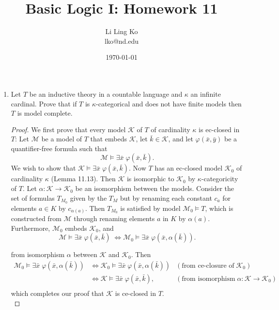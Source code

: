 \documentclass{article}
\begin{document}
\title{Basic Logic I: Homework 11}
\author{Li Ling Ko\\ lko@nd.edu}
\date{\today}
\maketitle

\begin{enumerate}[label={\bf Q\arabic*:}]
  \item Let $T$ be an inductive theory in a countable language and $\kappa$
    an infinite cardinal. Prove that if $T$ is $\kappa$-categorical and
    does not have finite models then $T$ is model complete.

    \begin{proof}
      We first prove that every model $\mathcal{K}$ of $T$ of cardinality
      $\kappa$ is ec-closed in $T$: Let $\mathcal{M}$ be a model of $T$
      that embeds $\mathcal{K}$, let $\bar{k}\in\mathcal{K}$, and let
      $\varphi(\bar{x},\bar{y})$ be a quantifier-free formula such that
      \[\mathcal{M}\models \exists\bar{x}\; \varphi(\bar{x},\bar{k}).\] We
      wish to show that $\mathcal{K}\models \exists\bar{x}\;
      \varphi(\bar{x},\bar{k})$. Now $T$ has an ec-closed model
      $\mathcal{K}_0$ of cardinality $\kappa$ (Lemma 11.13). Then
      $\mathcal{K}$ is isomorphic to $\mathcal{K}_0$ by
      $\kappa$-categoricity of $T$. Let
      $\alpha:\mathcal{K}\rightarrow\mathcal{K}_0$ be an isomorphism
      between the models. Consider the set of formulas $T_{M_0}$ given by
      the $T_M$ but by renaming each constant $c_a$ for elements $a\in K$
      by $c_{\alpha(a)}$. Then $T_{M_0}$ is satisfied by model
      $\mathcal{M}_0\models T$, which is constructed from $\mathcal{M}$
      through renaming elements $a$ in $K$ by $\alpha(a)$. Furthermore,
      $\mathcal{M}_0$ embeds $\mathcal{K}_0$, and
      \[\mathcal{M}\models \exists\bar{x}\; \varphi(\bar{x},\bar{k})\;
        \Leftrightarrow \mathcal{M}_0\models
        \exists\bar{x}\; \varphi(\bar{x},\alpha(\bar{k})).\]

      from isomorphism $\alpha$ between $\mathcal{K}$ and $\mathcal{K}_0$.
      Then
      \begin{align*}
        \mathcal{M}_0\models \exists\bar{x}\;
          \varphi(\bar{x},\alpha(\bar{k})) &\Leftrightarrow
            \mathcal{K}_0\models \exists\bar{x}\;
            \varphi(\bar{x},\alpha(\bar{k})) &(\text{from ce-closure of}\;
            \mathcal{K}_0) \\
          &\Leftrightarrow \mathcal{K}\models
            \exists\bar{x}\; \varphi(\bar{x},\bar{k}),
            &(\text{from isomorphism}\;
            \alpha:\mathcal{K}\rightarrow\mathcal{K}_0) \\
      \end{align*}
      which completes our proof that $\mathcal{K}$ is ce-closed in $T$. \\


\end{proof}
\end{enumerate}
\end{document}
